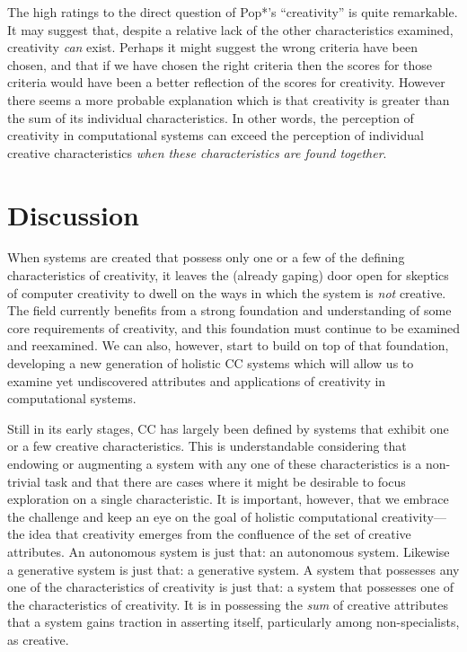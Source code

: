 \documentclass[phd,electronic,oneside,twosidetoc,letterpaper,chaptercenter,parttop,lol,lof,lot]{byumsphd}
\begin{document}
The high ratings to the direct question of Pop*'s ``creativity'' is quite remarkable. It may suggest that, despite a relative lack of the other characteristics examined, creativity \textit{can} exist. Perhaps it might suggest the wrong criteria have been chosen, and that if we have chosen the right criteria then the scores for those criteria would have been a better reflection of the scores for creativity. However there seems a more probable explanation which is that creativity is greater than the sum of its individual characteristics. In other words, the perception of creativity in computational systems can exceed the perception of individual creative characteristics \textit{when these characteristics are found together}.

\section{Discussion}

When systems are created that possess only one or a few of the defining characteristics of creativity, it leaves the (already gaping) door open for skeptics of computer creativity to dwell on the ways in which the system is \textit{not} creative. The field currently benefits from a strong foundation and understanding of some core requirements of creativity, and this foundation must continue to be examined and reexamined. We can also, however, start to build on top of that foundation, developing a new generation of holistic CC systems which will allow us to examine yet undiscovered attributes and applications of creativity in computational systems.

Still in its early stages, CC has largely been defined by systems that exhibit one or a few creative characteristics. This is understandable considering that endowing or augmenting a system with any one of these characteristics is a non-trivial task and that there are cases where it might be desirable to focus exploration on a single characteristic. It is important, however, that we embrace the challenge and keep an eye on the goal of holistic computational creativity---the idea that creativity emerges from the confluence of the set of creative attributes. An autonomous system is just that: an autonomous system. Likewise a generative system is just that: a generative system. A system that possesses any one of the characteristics of creativity is just that: a system that possesses one of the characteristics of creativity. It is in possessing the \textit{sum} of creative attributes that a system gains traction in asserting itself, particularly among non-specialists, as creative.
\newline
\end{document}
